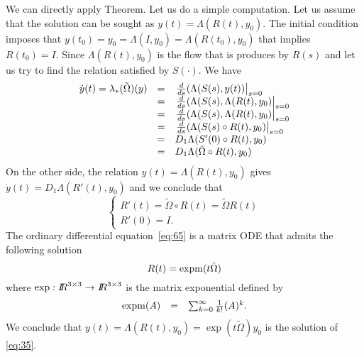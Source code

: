 We can directly apply Theorem. Let us do a simple computation.
Let us assume that the solution can be sought as $y(t) = \Lambda(R(t),y_0)$. The initial condition imposes that  $y(t_0) = y_0 = \Lambda(I,y_0) = \Lambda(R(t_0),y_0)$ that implies $R(t_0)=I$. Since $\Lambda(R(t),y_0)$ is the flow that is produces by $R(s)$ and let us try to find the relation satisfied by $S(\cdot)$. We have
\begin{equation}
  \label{eq:64}
  \begin{array}[lcl]{lcl}
    \dot y(t) = \lambda_*(\tilde \Omega)(y) &=& \left. \frac{d}{ds} (\Lambda(S(s),y(t)) \right|_{s=0} \\
                                &=& \left. \frac{d}{ds} (\Lambda(S(s), \Lambda(R(t),y_0 ) \right|_{s=0} \\
                                &=& \left. \frac{d}{ds} (\Lambda(S(s), \Lambda(R(t),y_0 ) \right|_{s=0} \\
                                &=& \left. \frac{d}{ds} (\Lambda(S(s)\circ R(t),y_0 ) \right|_{s=0} \\
                                &=& D_1 \Lambda(S'(0)\circ R(t),y_0 ) \\
                                &=& D_1 \Lambda(\tilde \Omega\circ R(t),y_0 )
  \end{array}
\end{equation}
On the other side, the relation $y(t) = \Lambda(R(t),y_0)$ gives $\dot y(t) = D_1 \Lambda(R'(t),y_0 )$ and we conclude that
\begin{equation}
  \label{eq:65}
  \begin{cases}
    R'(t) = \tilde\Omega\circ R(t)  = \tilde\Omega R(t)\\
    R'(0) = I.
  \end{cases}
\end{equation}
The ordinary differential equation~\eqref{eq:65} is a matrix ODE that admits the following solution
\begin{equation}
  \label{eq:66}
  R(t) = \operatorname{expm}(t\tilde\Omega)
\end{equation}
where $\exp : \mbox{\rm $I\!\!R$}^{3\times 3} \rightarrow \mbox{\rm $I\!\!R$}^{3\times 3}$ is the matrix exponential defined by
\begin{equation}
  \label{eq:67}
  \begin{array}[lcl]{lcl}
    \expm(A) &=& \sum_{k=0}^{\infty} \frac {1}{k!} (A)^k.
  \end{array}
\end{equation}
We conclude that $y(t) =\Lambda(R(t),y_0) = \exp(t\tilde\Omega) y_0 $ is the solution of \eqref{eq:35}.

